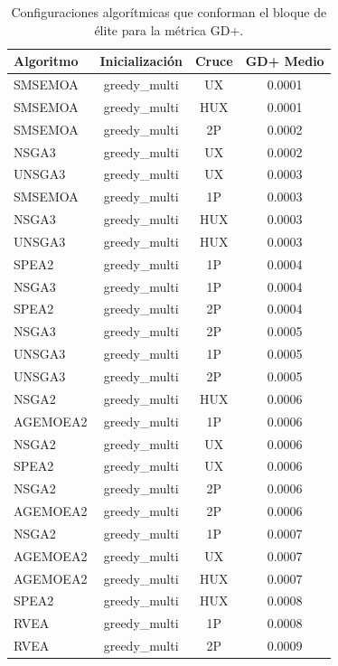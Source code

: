 \begin{table}[H]
    \centering
    \begin{tabular}{lccc}
        \toprule
        \textbf{Algoritmo} & \textbf{Inicialización} & \textbf{Cruce} & \textbf{GD+ Medio} \\
        \midrule
        SMSEMOA & greedy\_multi & UX & 0.0001 \\
        SMSEMOA & greedy\_multi & HUX & 0.0001 \\
        SMSEMOA & greedy\_multi & 2P & 0.0002 \\
        NSGA3 & greedy\_multi & UX & 0.0002 \\
        UNSGA3 & greedy\_multi & UX & 0.0003 \\
        SMSEMOA & greedy\_multi & 1P & 0.0003 \\
        NSGA3 & greedy\_multi & HUX & 0.0003 \\
        UNSGA3 & greedy\_multi & HUX & 0.0003 \\
        SPEA2 & greedy\_multi & 1P & 0.0004 \\
        NSGA3 & greedy\_multi & 1P & 0.0004 \\
        SPEA2 & greedy\_multi & 2P & 0.0004 \\
        NSGA3 & greedy\_multi & 2P & 0.0005 \\
        UNSGA3 & greedy\_multi & 1P & 0.0005 \\
        UNSGA3 & greedy\_multi & 2P & 0.0005 \\
        NSGA2 & greedy\_multi & HUX & 0.0006 \\
        AGEMOEA2 & greedy\_multi & 1P & 0.0006 \\
        NSGA2 & greedy\_multi & UX & 0.0006 \\
        SPEA2 & greedy\_multi & UX & 0.0006 \\
        NSGA2 & greedy\_multi & 2P & 0.0006 \\
        AGEMOEA2 & greedy\_multi & 2P & 0.0006 \\
        NSGA2 & greedy\_multi & 1P & 0.0007 \\
        AGEMOEA2 & greedy\_multi & UX & 0.0007 \\
        AGEMOEA2 & greedy\_multi & HUX & 0.0007 \\
        SPEA2 & greedy\_multi & HUX & 0.0008 \\
        RVEA & greedy\_multi & 1P & 0.0008 \\
        RVEA & greedy\_multi & 2P & 0.0009 \\
        \bottomrule
    \end{tabular}
    \caption[Bloque de élite de GD+]{Configuraciones algorítmicas que conforman el bloque de élite para la métrica GD+.}
    \label{tab:elite_gd}
\end{table}


